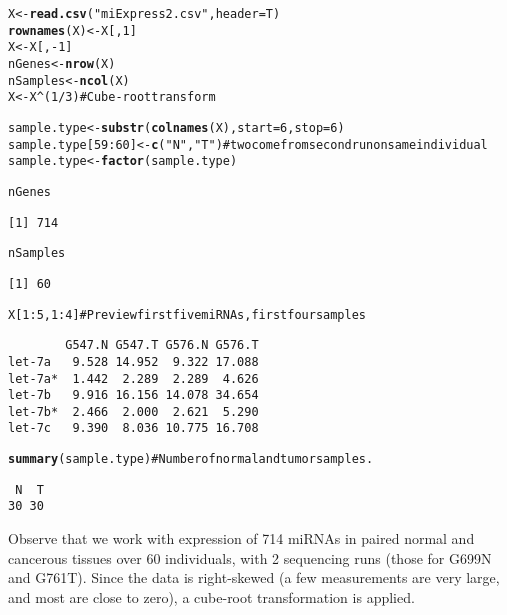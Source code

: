 \documentclass[12pt,english]{article}\usepackage{graphicx, color}
\makeatletter
\newcommand{\hlfunctioncall}[1]{\textcolor[rgb]{0.501960784313725,0,0.329411764705882}{\textbf{#1}}}%
\newcommand{\hlstring}[1]{\textcolor[rgb]{0.6,0.6,1}{#1}}%
\newcommand{\hlcomment}[1]{\textcolor[rgb]{0.180392156862745,0.6,0.341176470588235}{#1}}%
\newenvironment{kframe}{%
 \def\at@end@of@kframe{}%
 \ifinner\ifhmode%
  \def\at@end@of@kframe{\end{minipage}}%
  \begin{minipage}{\columnwidth}%
 \fi\fi%
 \def\FrameCommand##1{\hskip\@totalleftmargin \hskip-\fboxsep
 \colorbox{shadecolor}{##1}\hskip-\fboxsep
     \hskip-\linewidth \hskip-\@totalleftmargin \hskip\columnwidth}%
 \MakeFramed {\advance\hsize-\width
   \@totalleftmargin\z@ \linewidth\hsize
   \@setminipage}}%
 {\par\unskip\endMakeFramed%
 \at@end@of@kframe}
\newenvironment{knitrout}{}{} %
\numberwithin{equation}{section}
\numberwithin{figure}{section}
\theoremstyle{plain}
\theoremstyle{remark}
\makeatother
\begin{document}
\begin{spacing}{1}
\begin{knitrout}
\color{fgcolor}\begin{kframe}
\begin{alltt}
X <- \hlfunctioncall{read.csv}(\hlstring{"miExpress2.csv"}, header = T)
\hlfunctioncall{rownames}(X) <- X[, 1]
X <- X[, -1]
nGenes <- \hlfunctioncall{nrow}(X)
nSamples <- \hlfunctioncall{ncol}(X)
X <- X^(1/3)  \hlcomment{# Cube-root transform}

sample.type <- \hlfunctioncall{substr}(\hlfunctioncall{colnames}(X), start = 6, stop = 6)
sample.type[59:60] <- \hlfunctioncall{c}(\hlstring{"N"}, \hlstring{"T"})  # two come from second run on same individual
sample.type <- \hlfunctioncall{factor}(sample.type)

nGenes
\end{alltt}
\begin{verbatim}
[1] 714
\end{verbatim}
\begin{alltt}
nSamples
\end{alltt}
\begin{verbatim}
[1] 60
\end{verbatim}
\begin{alltt}

X[1:5, 1:4]  \hlcomment{# Preview first five miRNAs, first four samples}
\end{alltt}
\begin{verbatim}
        G547.N G547.T G576.N G576.T
let-7a   9.528 14.952  9.322 17.088
let-7a*  1.442  2.289  2.289  4.626
let-7b   9.916 16.156 14.078 34.654
let-7b*  2.466  2.000  2.621  5.290
let-7c   9.390  8.036 10.775 16.708
\end{verbatim}
\begin{alltt}

\hlfunctioncall{summary}(sample.type)  \hlcomment{# Number of normal and tumor samples.}
\end{alltt}
\begin{verbatim}
 N  T 
30 30 
\end{verbatim}
\end{kframe}
\end{knitrout}

\end{spacing}


Observe that we work with expression of 714 miRNAs in paired normal
and cancerous tissues over 60 individuals, with 2
sequencing runs (those for G699N and G761T). Since the data is
right-skewed (a few measurements are very large, and most are close
to zero), a cube-root transformation is applied.
\end{document}

